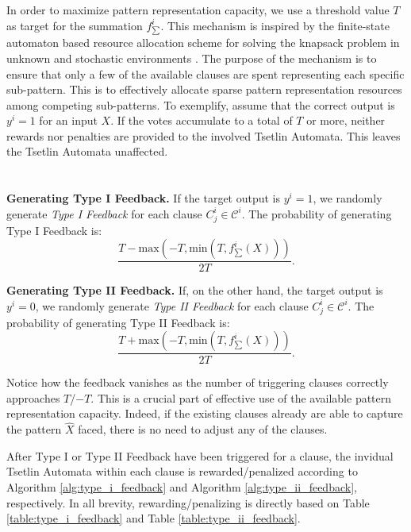 \documentclass[11pt,a4paper]{article}
\newcommand{\True}{\mbox{1}}
\newcommand{\False}{\mbox{0}}
\begin{document}
In order to maximize pattern representation capacity, we use a threshold value $T$ as target for the summation $f^i_{\sum}$. This mechanism is inspired by the finite-state automaton based resource allocation scheme for solving the knapsack problem in unknown and stochastic environments \cite{Granmo2007d}. The purpose of the mechanism is to ensure that only a few of the available clauses are spent representing each specific sub-pattern. This is to effectively allocate sparse pattern representation resources among competing sub-patterns. To exemplify, assume that the correct output is $y^i = \True$ for an input $X$. If the votes accumulate to a total of $T$ or more, neither rewards nor penalties are provided to the involved Tsetlin Automata. This leaves the Tsetlin Automata unaffected.
\\
\\
\\

{\bf Generating Type I Feedback.}  If the target output is $y^i=\True$, we randomly generate \emph{Type I Feedback} for each clause $C^i_j \in \mathcal{C}^i$. The probability of generating Type I Feedback is:
\begin{equation}
    \frac{T - \mathrm{max}(-T, \mathrm{min}(T, f^i_{\sum}(X)))}{2T}.
\end{equation}

{\bf Generating Type II Feedback.}  
If, on the other hand, the target output is $y^i = \False$, we randomly generate \emph{Type II Feedback} for each clause $C^i_j \in \mathcal{C}^i$. The probability of generating Type II Feedback is:
\begin{equation}
    \frac{T + \mathrm{max}(-T, \mathrm{min}(T, f^i_{\sum}(X)))}{2T}.
\end{equation}

Notice how the feedback vanishes as the number of triggering clauses correctly approaches $T$/$-T$. This is a crucial part of effective use of the available pattern representation capacity. Indeed, if the existing clauses already are able to capture the pattern $\hat{X}$ faced, there is no need to adjust any of the clauses.

After Type I or Type II Feedback have been triggered for a clause, the invidual Tsetlin Automata within each clause is rewarded/penalized according to Algorithm \ref{alg:type_i_feedback} and Algorithm \ref{alg:type_ii_feedback}, respectively. In all brevity, rewarding/penalizing is directly based on Table \ref{table:type_i_feedback} and Table \ref{table:type_ii_feedback}.
\end{document}

